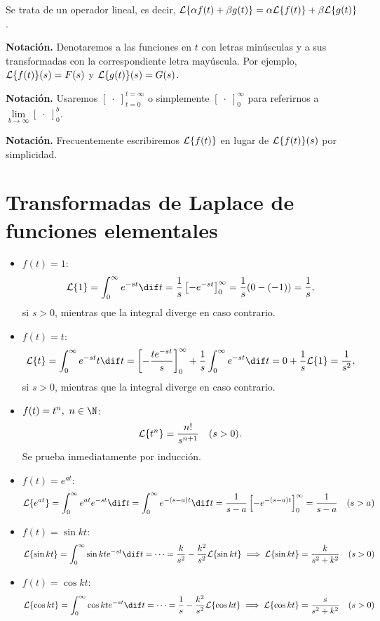 \documentclass[../ecuaciones_diferenciales.tex]{subfiles}
\begin{document}
\begin{remark}
	Se trata de un operador lineal, es decir, \(\mathcal{L}\{\alpha f(t) + \beta g(t)\} =
	\alpha \mathcal{L}\{f(t)\} + \beta \mathcal{L}\{g(t)\}\).
\end{remark}

\textbf{Notación.} Denotaremos a las funciones en \(t\) con letras minúsculas y
a sus transformadas con la correspondiente letra mayúscula. Por
ejemplo, \(\mathcal{L}\{f(t)\}(s) = F(s)\) y \(\mathcal{L}\{g(t)\}(s) = G(s)\).

\textbf{Notación.} Usaremos \([\;\cdot\;]_{t=0}^{t=\infty}\) o simplemente
\([\;\cdot\;]_0^\infty\) para referirnos a
\(\lim \limits_{b \to \infty} [\;\cdot\;]_0^b\).

\textbf{Notación.} Frecuentemente escribiremos \(\mathcal{L}\{f(t)\}\) en lugar de
\(\mathcal{L}\{f(t)\}(s)\) por simplicidad.

\section{Transformadas de Laplace de funciones elementales}

\begin{itemize}
	\item \(f(t) = 1\):
	      \[\L\{1\} = \int_0^\infty e^{-st} \dif t = \frac{1}{s}
		      \left[-e^{-st}\right]_0^\infty = \frac{1}{s}(0-(-1)) =
		      \frac{1}{s},\]
	      si \(s > 0\), mientras que la integral diverge en caso contrario.
	\item \(f(t) = t\):
	      \[\L\{t\} = \int_0^\infty e^{-st}t \dif t =
		      \left[-\frac{te^{-st}}{s}\right]_0^\infty + \frac{1}{s} \int_0^\infty
		      e^{-st} \dif t = 0 + \frac{1}{s} \L\{1\} = \frac{1}{s^2},\]
	      si \(s > 0\), mientras que la integral diverge en caso contrario.
	\item \(f(t) = t^n,\ n \in \N\):
	      \[\mathcal{L}\{t^n\} = \frac{n!}{s^{n+1}} \quad (s>0).\]
	      Se prueba inmediatamente por inducción.
	\item \(f(t) = e^{at}\):
	      \[\L\{e^{at}\} = \int_0^\infty e^{at}e^{-st} \dif t = \int_0^\infty
		      e^{-(s-a)t} \dif t = \frac{1}{s-a}\left[-e^{-(s-a)t}\right]_0^\infty =
		      \frac{1}{s-a} \quad (s>a)\]
	\item \(f(t) = \sin kt\):
	      \[\L\{\sin kt\} = \int_0^\infty \sin kt e^{-st} \dif t = \cdots = \frac{k}{s^2} -
		      \frac{k^2}{s^2} \L\{\sin kt\} \implies \L\{\sin kt\} = \frac{k}{s^2+k^2}
		      \quad (s>0)\]
	\item \(f(t) = \cos kt\):
	      \[\L\{\cos kt\} = \int_0^\infty \cos kt e^{-st} \dif t = \cdots = \frac{1}{s} -
		      \frac{k^2}{s^2}\L\{\cos kt\} \implies  \L\{\cos kt\} = \frac{s}{s^2+k^2}
		      \quad (s>0)\]
\end{itemize}
\end{document}
